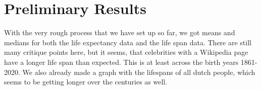 \documentclass{article}
\begin{document}
\section{Preliminary Results}
With the very rough process that we have set up so far, we got means and medians for both the life expectancy data and the life span data. There are still many critique points here, but it seems, that celebrities with a Wikipedia page have a longer life span than expected. This is at least across the birth years 1861-2020. We also already made a graph with the lifespans of all dutch people, which seems to be getting longer over the centuries as well. 
\end{document}
